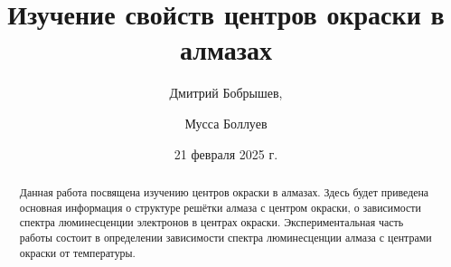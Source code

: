 \title{Изучение свойств центров окраски в алмазах}
\author{Дмитрий Бобрышев,}
\author{Мусса Боллуев}

\date{21 февраля 2025 г.}

\begin{abstract}
    Данная работа посвящена изучению центров окраски в алмазах. 
    Здесь будет приведена основная информация о структуре решётки алмаза
    с центром окраски, о зависимости 
    спектра люминесценции электронов в центрах окраски. Экспериментальная часть
    работы состоит в определении зависимости спектра люминесценции
    алмаза с центрами окраски от температуры.
\end{abstract}

